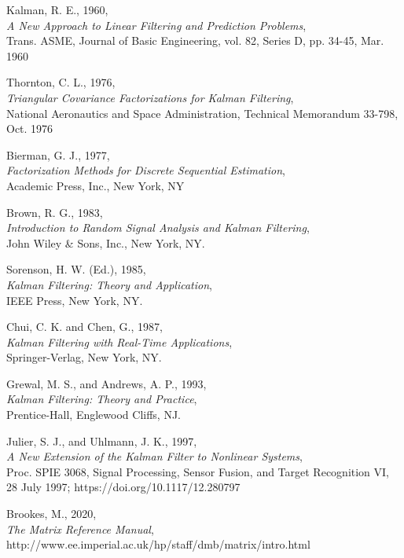\documentclass[12pt]{article}
\begin{document}
\begin{thebibliography}{9}


Kalman, R. E., 1960, \\
\emph{A New Approach to Linear Filtering and Prediction Problems}, \\
Trans. ASME, Journal of Basic Engineering, vol. 82, Series D, pp. 34-45, Mar. 1960

Thornton, C. L., 1976, \\
\emph{Triangular Covariance Factorizations for Kalman Filtering}, \\
National Aeronautics and Space Administration, Technical Memorandum 33-798, Oct. 1976

Bierman, G. J., 1977, \\
\emph{Factorization Methods for Discrete Sequential Estimation}, \\
Academic Press, Inc., New York, NY

Brown, R. G., 1983, \\
\emph{Introduction to Random Signal Analysis and Kalman Filtering}, \\
John Wiley \& Sons, Inc., New York, NY.

Sorenson, H. W. (Ed.), 1985, \\
\emph{Kalman Filtering: Theory and Application}, \\
IEEE Press, New York, NY.

Chui, C. K. and Chen, G., 1987, \\
\emph{Kalman Filtering with Real-Time Applications}, \\
Springer-Verlag, New York, NY.

Grewal, M. S., and Andrews, A. P., 1993, \\
\emph{Kalman Filtering: Theory and Practice}, \\
Prentice-Hall, Englewood Cliffs, NJ.

Julier, S. J., and Uhlmann, J. K., 1997, \\
\emph{A New Extension of the Kalman Filter to Nonlinear Systems}, \\
Proc. SPIE 3068, Signal Processing, Sensor Fusion, and Target Recognition VI, 28 July 1997; https://doi.org/10.1117/12.280797

Brookes, M., 2020, \\
\emph{The Matrix Reference Manual}, \\
http://www.ee.imperial.ac.uk/hp/staff/dmb/matrix/intro.html

\end{thebibliography}

\clearpage



\end{document}

